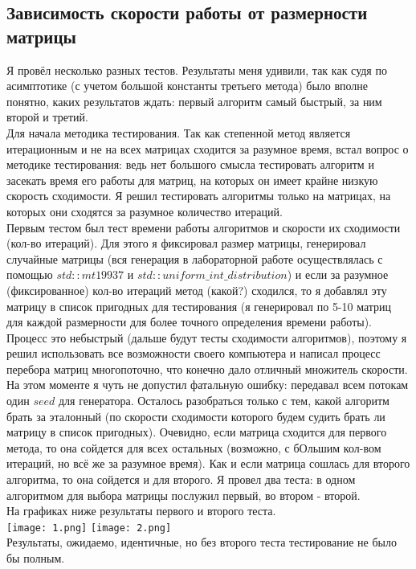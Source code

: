 \documentclass[a4paper,12pt,fleqn]{article}
\begin{document}
\subsection{Зависимость скорости работы от размерности матрицы}
Я провёл несколько разных тестов. Результаты меня удивили, так как судя по асимптотике (с учетом большой константы третьего метода) было вполне понятно, каких результатов ждать: первый алгоритм самый быстрый, за ним второй и третий. \\
Для начала методика тестирования. Так как степенной метод является итерационным и не на всех матрицах сходится за разумное время, встал вопрос о методике тестирования: ведь нет большого смысла тестировать алгоритм и засекать время его работы для матриц, на которых он имеет крайне низкую скорость сходимости. Я решил тестировать алгоритмы только на матрицах, на которых они сходятся за разумное количество итераций.\\
Первым тестом был тест времени работы алгоритмов и скорости их сходимости (кол-во итераций). Для этого я фиксировал размер матрицы, генерировал случайные матрицы (вся генерация в лабораторной работе осуществлялась с помощью $std::mt19937$ и $std::uniform\_int\_distribution$) и если за разумное (фиксированное) кол-во итераций метод (какой?) сходился, то я добавлял эту матрицу в список пригодных для тестирования (я генерировал по 5-10 матриц для каждой размерности для более точного определения времени работы). Процесс это небыстрый (дальше будут тесты сходимости алгоритмов), поэтому я решил использовать все возможности своего компьютера и написал процесс перебора матриц многопоточно, что конечно дало отличный множитель скорости. На этом моменте я чуть не допустил фатальную ошибку: передавал всем потокам один $seed$ для генератора. Осталось разобраться только с тем, какой алгоритм брать за эталонный (по скорости сходимости которого будем судить брать ли матрицу в список пригодных). Очевидно, если матрица сходится для первого метода, то она сойдется для всех остальных (возможно, с бОльшим кол-вом итераций, но всё же за разумное время). Как и если матрица сошлась для второго алгоритма, то она сойдется и для второго. Я провел два теста: в одном алгоритмом для выбора матрицы послужил первый, во втором - второй. \\
На графиках ниже результаты первого и второго теста. \\
\texttt{[image: 1.png]}
\texttt{[image: 2.png]}\\
Результаты, ожидаемо, идентичные, но без второго теста тестирование не было бы полным.\\
\end{document}
